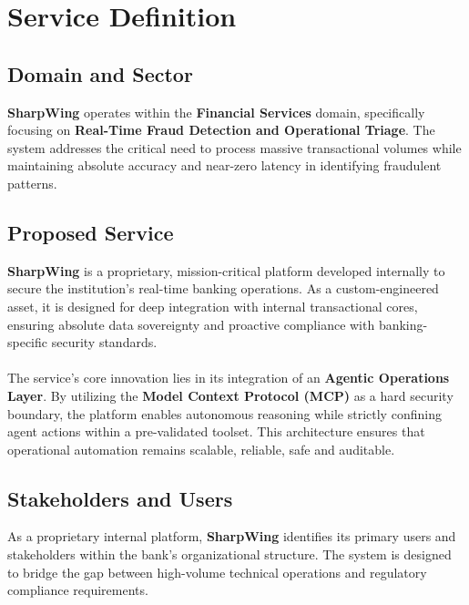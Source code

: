 \documentclass[12pt]{report}
\begin{document}
\chapter{Service Definition}
\label{ch:service_definition}

\section{Domain and Sector}
\textbf{SharpWing} operates within the \textbf{Financial Services} domain, specifically focusing on \textbf{Real-Time Fraud Detection and Operational Triage}. The system addresses the critical need to process massive transactional volumes while maintaining absolute accuracy and near-zero latency in identifying fraudulent patterns.

\section{Proposed Service}
\textbf{SharpWing} is a proprietary, mission-critical platform developed internally to secure the institution's real-time banking operations. As a custom-engineered asset, it is designed for deep integration with internal transactional cores, ensuring absolute data sovereignty and proactive compliance with banking-specific security standards.\\\\
The service's core innovation lies in its integration of an \textbf{Agentic Operations Layer}. By utilizing the \textbf{Model Context Protocol (MCP)} as a hard security boundary, the platform enables autonomous reasoning while strictly confining agent actions within a pre-validated toolset. This architecture ensures that operational automation remains scalable, reliable, safe and auditable.

\section{Stakeholders and Users}
As a proprietary internal platform, \textbf{SharpWing} identifies its primary users and stakeholders within the bank's organizational structure. The system is designed to bridge the gap between high-volume technical operations and regulatory compliance requirements.
\end{document}
